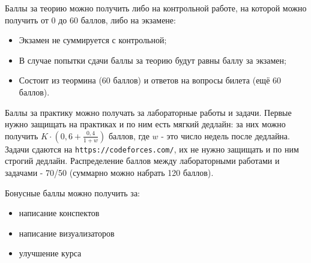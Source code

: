 Баллы за теорию можно получить либо на контрольной работе, на которой можно получить от 0 до 60 баллов, либо на экзамене:
\begin{itemize}
    \item Экзамен не суммируется с контрольной;
    \item В случае попытки сдачи баллы за теорию будут равны баллу за экзамен;
    \item Состоит из теормина (60 баллов) и ответов на вопросы билета (ещё 60 баллов).
\end{itemize}

Баллы за практику можно получать за лабораторные работы и задачи. Первые нужно защищать на практиках и по ним есть мягкий дедлайн: за них можно получить $K\cdot\left(0,6 + \frac{0,4}{1 + w}\right)$ баллов, где $w$ - это число недель после дедлайна. Задачи сдаются на \texttt{https://codeforces.com/}, их не нужно защищать и по ним строгий дедлайн. Распределение баллов между лабораторными работами и задачами - 70/50 (суммарно можно набрать 120 баллов).

Бонусные баллы можно получить за:
\begin{itemize}
    \item написание конспектов
    \item написание визуализаторов
    \item улучшение курса
\end{itemize}
